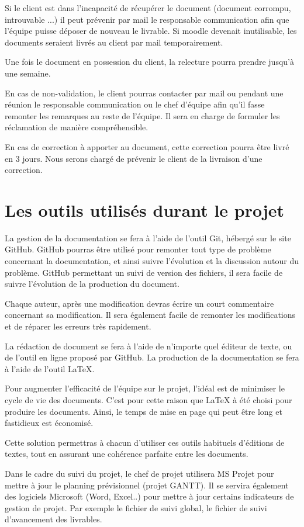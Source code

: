 Si le client est dans l’incapacité de récupérer le document (document corrompu, introuvable ...) il peut prévenir par mail le responsable communication afin que l’équipe puisse déposer de nouveau le livrable.
Si moodle devenait inutilisable, les documents seraient livrés au client par mail temporairement.

Une fois le document en possession du client, la relecture pourra prendre jusqu’à une semaine.

En cas de non-validation, le client pourras contacter par mail ou pendant une réunion le responsable communication ou le chef d’équipe afin qu’il fasse remonter les remarques au reste de l’équipe.
Il sera en charge de formuler les réclamation de manière compréhensible.

En cas de correction à apporter au document, cette correction pourra être livré en 3 jours.
Nous serons chargé de prévenir le client de la livraison d’une correction.

\section{Les outils utilisés durant le projet}

La gestion de la documentation se fera à l’aide de l’outil Git, hébergé sur le site GitHub.
GitHub pourras être utilisé pour remonter tout type de problème concernant la documentation, et ainsi suivre l'évolution et la discussion autour du problème.
GitHub permettant un suivi de version des fichiers, il sera facile de suivre l'évolution de la production du document.

Chaque auteur, après une modification devras écrire un court commentaire concernant sa modification.
Il sera également facile de remonter les modifications et de réparer les erreurs très rapidement.

La rédaction de document se fera à l’aide de n’importe quel éditeur de texte, ou de l'outil en ligne proposé par GitHub.
La production de la documentation se fera à l’aide de l'outil LaTeX.

Pour augmenter l'efficacité de l'équipe sur le projet, l’idéal est de minimiser le cycle de vie des documents.
C'est pour cette raison que LaTeX à été choisi pour produire les documents.
Ainsi, le temps de mise en page qui peut être long et fastidieux est économisé.

Cette solution permettras à chacun  d’utiliser ces outils habituels d’éditions de textes, tout en assurant une cohérence parfaite entre les documents.

Dans le cadre du suivi du projet, le chef de projet utilisera MS Projet pour mettre à jour le planning 
prévisionnel (projet GANTT). Il se servira également des logiciels Microsoft (Word, Excel..) pour mettre à jour certains indicateurs de gestion de projet. Par exemple le fichier de suivi global, le fichier de suivi d'avancement des livrables.
